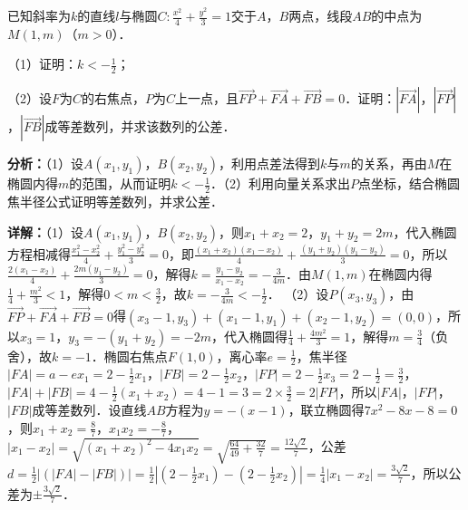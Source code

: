 \begin{question}[points=12]
已知斜率为$k$的直线$l$与椭圆$C:\frac{x^2}{4}+\frac{y^2}{3}=1$交于$A$，$B$两点，线段$AB$的中点为$M(1,m)$（$m>0$）．

（1）证明：$k<-\frac{1}{2}$；

（2）设$F$为$C$的右焦点，$P$为$C$上一点，且$\overrightarrow{FP}+\overrightarrow{FA}+\overrightarrow{FB}=0$．证明：$|\overrightarrow{FA}|$，$|\overrightarrow{FP}|$，$|\overrightarrow{FB}|$成等差数列，并求该数列的公差．
\begin{solution}

\textbf{分析：}（1）设$A(x_1,y_1)$，$B(x_2,y_2)$，利用点差法得到$k$与$m$的关系，再由$M$在椭圆内得$m$的范围，从而证明$k<-\frac{1}{2}$．（2）利用向量关系求出$P$点坐标，结合椭圆焦半径公式证明等差数列，并求公差．

\textbf{详解：}（1）设$A(x_1,y_1)$，$B(x_2,y_2)$，则$x_1+x_2=2$，$y_1+y_2=2m$，代入椭圆方程相减得$\frac{x_1^2-x_2^2}{4}+\frac{y_1^2-y_2^2}{3}=0$，即$\frac{(x_1+x_2)(x_1-x_2)}{4}+\frac{(y_1+y_2)(y_1-y_2)}{3}=0$，所以$\frac{2(x_1-x_2)}{4}+\frac{2m(y_1-y_2)}{3}=0$，解得$k=\frac{y_1-y_2}{x_1-x_2}=-\frac{3}{4m}$．由$M(1,m)$在椭圆内得$\frac{1}{4}+\frac{m^2}{3}<1$，解得$0<m<\frac{3}{2}$，故$k=-\frac{3}{4m}<-\frac{1}{2}$．
（2）设$P(x_3,y_3)$，由$\overrightarrow{FP}+\overrightarrow{FA}+\overrightarrow{FB}=0$得$(x_3-1,y_3)+(x_1-1,y_1)+(x_2-1,y_2)=(0,0)$，所以$x_3=1$，$y_3=-(y_1+y_2)=-2m$，代入椭圆得$\frac{1}{4}+\frac{4m^2}{3}=1$，解得$m=\frac{3}{4}$（负舍），故$k=-1$．椭圆右焦点$F(1,0)$，离心率$e=\frac{1}{2}$，焦半径$|FA|=a-ex_1=2-\frac{1}{2}x_1$，$|FB|=2-\frac{1}{2}x_2$，$|FP|=2-\frac{1}{2}x_3=2-\frac{1}{2}=\frac{3}{2}$，$|FA|+|FB|=4-\frac{1}{2}(x_1+x_2)=4-1=3=2\times\frac{3}{2}=2|FP|$，所以$|FA|$，$|FP|$，$|FB|$成等差数列．设直线$AB$方程为$y=-(x-1)$，联立椭圆得$7x^2-8x-8=0$，则$x_1+x_2=\frac{8}{7}$，$x_1x_2=-\frac{8}{7}$，$|x_1-x_2|=\sqrt{(x_1+x_2)^2-4x_1x_2}=\sqrt{\frac{64}{49}+\frac{32}{7}}=\frac{12\sqrt{2}}{7}$，公差$d=\frac{1}{2}|(|FA|-|FB|)|=\frac{1}{2}|(2-\frac{1}{2}x_1)-(2-\frac{1}{2}x_2)|=\frac{1}{4}|x_1-x_2|=\frac{3\sqrt{2}}{7}$，所以公差为$\pm\frac{3\sqrt{2}}{7}$．
\end{solution}
\end{question}

